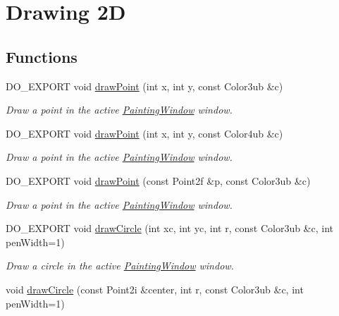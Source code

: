 \hypertarget{group___draw2_d}{\section{Drawing 2\-D}
\label{group___draw2_d}
}
\subsection*{Functions}
\begin{DoxyCompactItemize}
\item 
D\-O\-\_\-\-E\-X\-P\-O\-R\-T void \hyperlink{group___draw2_d_gac5a7d7f69f27b67a54658d70fd2ecf92}{draw\-Point} (int x, int y, const Color3ub \&c)
\begin{DoxyCompactList}\small\item\em Draw a point in the active \hyperlink{class_d_o_1_1_painting_window}{Painting\-Window} window. \end{DoxyCompactList}\item 
D\-O\-\_\-\-E\-X\-P\-O\-R\-T void \hyperlink{group___draw2_d_ga404236e564421c6870b162167e459491}{draw\-Point} (int x, int y, const Color4ub \&c)
\begin{DoxyCompactList}\small\item\em Draw a point in the active \hyperlink{class_d_o_1_1_painting_window}{Painting\-Window} window. \end{DoxyCompactList}\item 
D\-O\-\_\-\-E\-X\-P\-O\-R\-T void \hyperlink{group___draw2_d_gafd722a4bc47cf9ce5110ee6b639b2b3f}{draw\-Point} (const Point2f \&p, const Color3ub \&c)
\begin{DoxyCompactList}\small\item\em Draw a point in the active \hyperlink{class_d_o_1_1_painting_window}{Painting\-Window} window. \end{DoxyCompactList}\item 
D\-O\-\_\-\-E\-X\-P\-O\-R\-T void \hyperlink{group___draw2_d_ga752f49150f8f2f6ff00806fca131b86c}{draw\-Circle} (int xc, int yc, int r, const Color3ub \&c, int pen\-Width=1)
\begin{DoxyCompactList}\small\item\em Draw a circle in the active \hyperlink{class_d_o_1_1_painting_window}{Painting\-Window} window. \end{DoxyCompactList}\item 
void \hyperlink{group___draw2_d_ga0dcd2c6ad80005cf9fc3e92198fc508f}{draw\-Circle} (const Point2i \&center, int r, const Color3ub \&c, int pen\-Width=1)

\end{DoxyCompactItemize}
